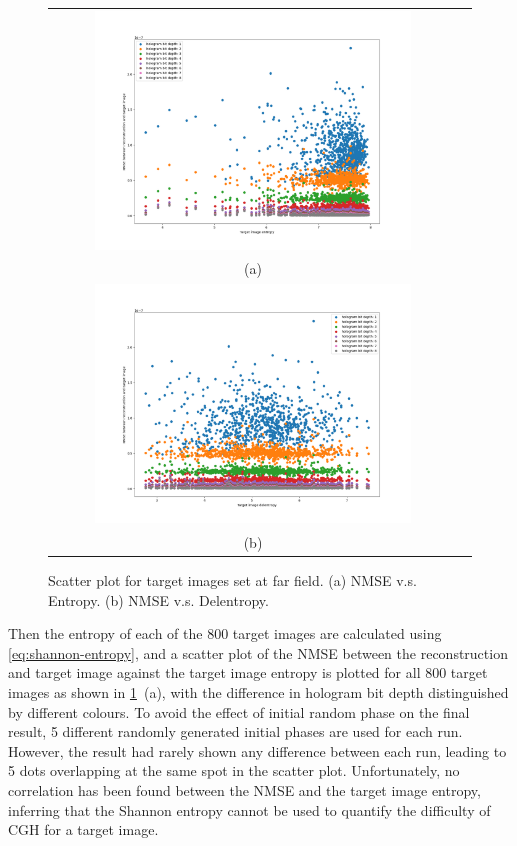	\begin{figure} [H]
		\begin{center}
			\begin{tabular}{c c}
				\includegraphics[trim={80 50 90 70}, clip, width = 0.8\textwidth]{GS_Fraunhofer_NMSE_VS_Entropy.png} \\
				(a)\\
				\includegraphics[trim={80 50 90 70}, clip, width = 0.8\textwidth]{GS_Fraunhofer_NMSE_VS_Delentropy.png} \\
				(b)
			\end{tabular}
			\caption{\label{fig:GS_Fraunhofer_NMSE_VS_Entropy_Delentropy} Scatter plot for target images set at far field. (a) NMSE v.s. Entropy. (b) NMSE v.s. Delentropy.}
		\end{center}
	\end{figure}

	Then the entropy of each of the 800 target images are calculated using \cref{eq:shannon-entropy}, and a scatter plot of the NMSE between the reconstruction and target image against the target image entropy is plotted for all 800 target images as shown in \cref{fig:GS_Fraunhofer_NMSE_VS_Entropy_Delentropy}~(a), with the difference in hologram bit depth distinguished by different colours. To avoid the effect of initial random phase on the final result, 5 different randomly generated initial phases are used for each run. However, the result \cite{research_data_Sha2024} had rarely shown any difference between each run, leading to 5 dots overlapping at the same spot in the scatter plot. Unfortunately, no correlation has been found between the NMSE and the target image entropy, inferring that the Shannon entropy cannot be used to quantify the difficulty of CGH for a target image.

